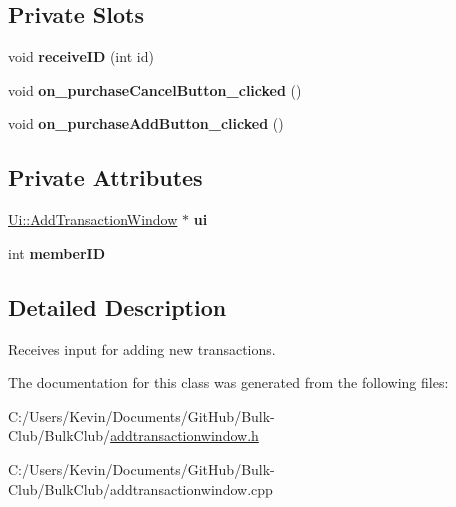 \subsection*{Private Slots}
\begin{DoxyCompactItemize}
\item 
\mbox{\label{class_add_transaction_window_a6a63de5120babcfab16e54d9dbab7017}} 
void {\bfseries receive\+ID} (int id)
\item 
\mbox{\label{class_add_transaction_window_a2e525c846126be6283d0501797eca38d}} 
void {\bfseries on\+\_\+purchase\+Cancel\+Button\+\_\+clicked} ()
\item 
\mbox{\label{class_add_transaction_window_aa058ee613947cc1dad354914c8389dfe}} 
void {\bfseries on\+\_\+purchase\+Add\+Button\+\_\+clicked} ()
\end{DoxyCompactItemize}
\subsection*{Private Attributes}
\begin{DoxyCompactItemize}
\item 
\mbox{\label{class_add_transaction_window_a1215d580eaacb06b321863a0588f83b0}} 
\mbox{\hyperlink{class_ui_1_1_add_transaction_window}{Ui\+::\+Add\+Transaction\+Window}} $\ast$ {\bfseries ui}
\item 
\mbox{\label{class_add_transaction_window_a4eeb7dd947d93f4bfe26d6d691c66b31}} 
int {\bfseries member\+ID}
\end{DoxyCompactItemize}


\subsection{Detailed Description}
Receives input for adding new transactions. 

The documentation for this class was generated from the following files\+:\begin{DoxyCompactItemize}
\item 
C\+:/\+Users/\+Kevin/\+Documents/\+Git\+Hub/\+Bulk-\/\+Club/\+Bulk\+Club/\mbox{\hyperlink{addtransactionwindow_8h}{addtransactionwindow.\+h}}\item 
C\+:/\+Users/\+Kevin/\+Documents/\+Git\+Hub/\+Bulk-\/\+Club/\+Bulk\+Club/addtransactionwindow.\+cpp\end{DoxyCompactItemize}

